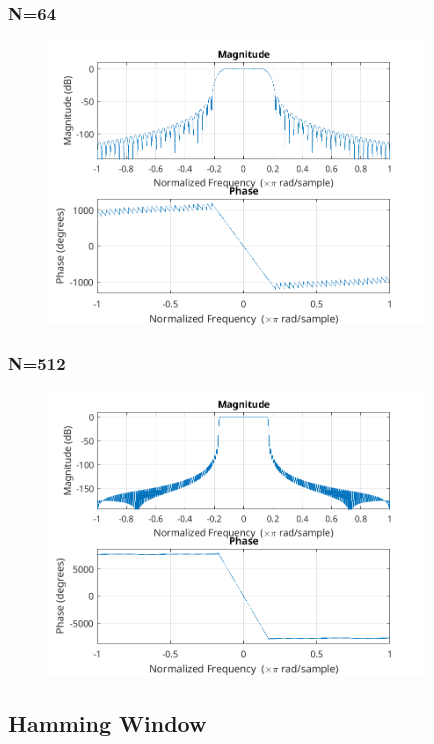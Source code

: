 \documentclass{article}
\begin{document}
  \subsubsection{N=64}
  \begin{figure}[!htb]
  \includegraphics[width=10cm]{freqz_han_64.png}
  \end{figure}
  \subsubsection{N=512}
  \begin{figure}[!htb]
  \includegraphics[width=10cm]{freqz_han_512.png}
  \end{figure}
\subsection{Hamming Window}
\end{document}
